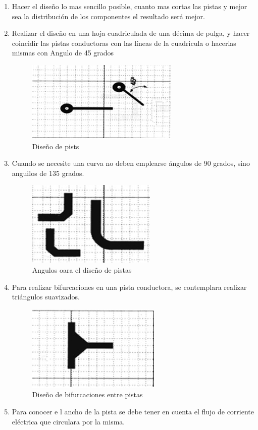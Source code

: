 \documentclass[a4paper,12pt,twoside]{proyectotanquesecci}
\begin{document}
\begin{enumerate}
\item Hacer el diseño  lo mas sencillo posible, cuanto mas cortas las pistas y mejor sea la distribución de los componentes el resultado será mejor.
\item Realizar el diseño  en una hoja cuadriculada de una décima de pulga, y hacer coincidir las pistas conductoras con las líneas de la cuadricula o hacerlas mismas con Angulo de 45 grados
\begin{figure}[h]
\centering
\includegraphics[scale=0.8]{pauta1.jpg}
\renewcommand{\figurename}{Fig.}
\caption{Diseño de pists}
\label{Diseño de pistas}
\end{figure}

\item Cuando se necesite una curva no deben emplearse ángulos de  90 grados, sino anguilos de 135 grados.

 \begin{figure}[h]
 \centering
 \includegraphics[scale=0.8]{pauta3.jpg}
 \renewcommand{\figurename}{Fig.}
 \caption{Angulos oara el diseño de pistas }
 \label{Angulos oara el diseño de pistas }
 \end{figure}
\item Para realizar bifurcaciones  en una pista conductora, se contemplara realizar triángulos  suavizados.
 \begin{figure}[h]
 \centering
 \includegraphics[scale=1.0]{pauta4.jpg}
 \renewcommand{\figurename}{Fig.}
 \caption{Diseño de bifurcaciones entre pistas}
 \label{Diseño de bifurcaciones entre pista }
 \end{figure}
 \item Para conocer e l ancho de la pista  se   debe tener en cuenta el flujo de corriente eléctrica que circulara por la misma.


\end{enumerate}
\end{document}
